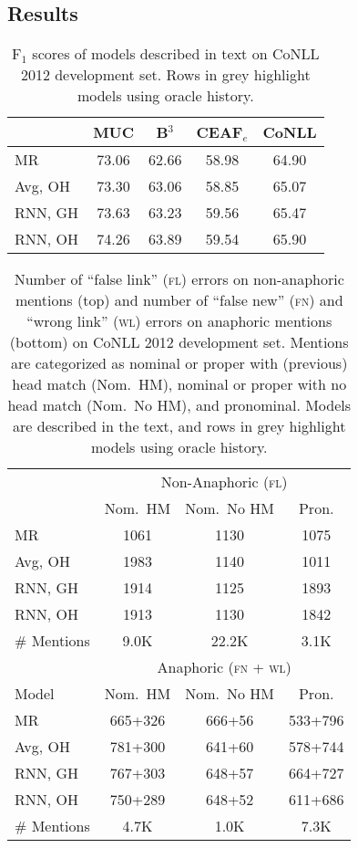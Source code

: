 \documentclass[11pt,letterpaper]{article}
\begin{document}
\subsection{Results}
\newcommand{\fix}[1]{{\color{white}1}#1}
\newcommand{\fixg}[1]{{\color{Gray}1}#1}
\begin{table}[t!]
\centering
\small
\begin{tabular}{lcccc}
\toprule 
 & MUC & B$^3$ & CEAF$_e$ & CoNLL \\ 
\midrule 
MR          & 73.06 & 62.66 & 58.98 & 64.90 \\
\rowcolor{Gray}
Avg, OH    & 73.30 & 63.06 & 58.85 & 65.07 \\
RNN, GH & 73.63 & 63.23 & 59.56 & 65.47 \\
\rowcolor{Gray}
RNN, OH  & 74.26 & 63.89 & 59.54 & 65.90 \\
\bottomrule 
\end{tabular} 
\caption{F$_1$ scores of models described in text on CoNLL 2012 development set. Rows in grey highlight models using oracle history.}
\label{tab:conlldev}
\end{table}
\begin{table}[t!]
\small
\begin{tabular}{lccc}
 \toprule 
 & \multicolumn{3}{c}{Non-Anaphoric (\textsc{fl})} \\
  & Nom.~HM & Nom.~No HM & Pron. \\
 \midrule
MR  & {1061} & \fix{130} & {1075} \\
\rowcolor{Gray}
Avg, OH  & \fixg{983} & \fixg{140} & {1011}\\
RNN, GH  & \fix{914} & \fix{125} & \fix{893}\\
\rowcolor{Gray}
RNN, OH  & \fixg{913} & \fixg{130} & \fixg{842}\\
\midrule
\# Mentions & 9.0K  & 22.2K & 3.1K \\
\toprule
& \multicolumn{3}{c}{Anaphoric (\textsc{fn} + \textsc{wl})} \\
 Model & Nom.~HM & Nom.~No HM & Pron. \\
 \midrule
MR  & 665+326 & 666+56 & 533+796 \\
\rowcolor{Gray}
Avg, OH  & 781+300 & 641+60 & 578+744\\
RNN, GH  & 767+303 & 648+57 & 664+727 \\
\rowcolor{Gray}
RNN, OH  & 750+289 & 648+52 & 611+686 \\
\midrule
\# Mentions & 4.7K  & 1.0K & 7.3K \\
 \bottomrule
\end{tabular} 
\caption{Number of ``false link'' (\textsc{fl}) errors on non-anaphoric mentions (top) and number of ``false new'' (\textsc{fn}) and ``wrong link'' (\textsc{wl}) errors on anaphoric mentions (bottom) on CoNLL 2012 development set. Mentions are categorized as nominal or proper with (previous) head match (Nom.~HM), nominal or proper with no head match (Nom.~No HM), and pronominal. Models are described in the text, and rows in grey highlight models using oracle history.}
\label{tab:newerrors}
\end{table}
\end{document}
